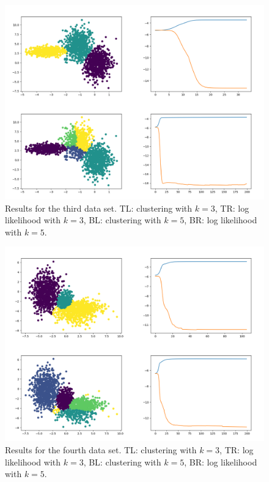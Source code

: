 \documentclass{article}
\begin{document}
\begin{figure}[!ht]
	\centering
	\includegraphics[width=120mm]{figs/gmm_ds2_orthog_plt_ll.png}
	\caption{Results for the third data set. TL: clustering with $k = 3$, TR: log likelihood with $k = 3$, BL: clustering with $k = 5$, BR: log likelihood with $k = 5$.}
\end{figure}

\begin{figure}[!ht]
	\centering
	\includegraphics[width=120mm]{figs/gmm_ds3_orthog_plt_ll.png}
	\caption{Results for the fourth data set. TL: clustering with $k = 3$, TR: log likelihood with $k = 3$, BL: clustering with $k = 5$, BR: log likelihood with $k = 5$.}
\end{figure}
\end{document}
